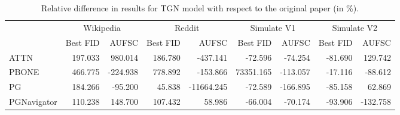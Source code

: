 \begin{table}
\centering
\caption{Relative difference in results for TGN model with respect to the original paper (in \%).}
\label{tab:tgn_results_diff}
\begin{tabular}{lrrrrrrrr}
\toprule
 & \multicolumn{2}{c}{Wikipedia} & \multicolumn{2}{c}{Reddit} & \multicolumn{2}{c}{Simulate V1} & \multicolumn{2}{c}{Simulate V2} \\
 & Best FID & AUFSC & Best FID & AUFSC & Best FID & AUFSC & Best FID & AUFSC \\
\midrule
ATTN & 197.033 & 980.014 & 186.780 & -437.141 & -72.596 & -74.254 & -81.690 & 129.742 \\
PBONE & 466.775 & -224.938 & 778.892 & -153.866 & 73351.165 & -113.057 & -17.116 & -88.612 \\
PG & 184.266 & -95.200 & 45.838 & -11664.245 & -72.589 & -166.895 & -85.158 & 62.869 \\
PGNavigator & 110.238 & 148.700 & 107.432 & 58.986 & -66.004 & -70.174 & -93.906 & -132.758 \\
\bottomrule
\end{tabular}
\end{table}
